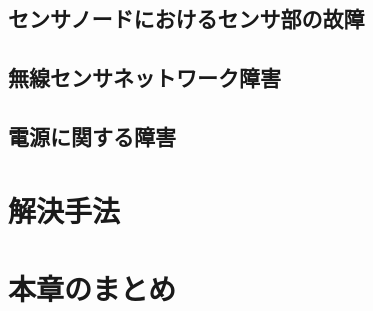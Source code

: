 \subsection{センサノードにおけるセンサ部の故障}

\newpage

\subsection{無線センサネットワーク障害}

\subsection{電源に関する障害}

\newpage

\section{解決手法}

\section{本章のまとめ}
